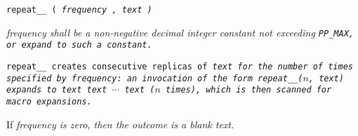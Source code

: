 
\tt{repeat__ (} \it{frequency} \tt{,} \it{text} \tt{)}


\it{frequency} shall be a non-negative decimal integer constant
not exceeding \tt{PP_MAX}, or expand to such a constant.


\tt{repeat__} creates consecutive replicas of \it{text}
for the number of times specified by \it{frequency}:
an invocation of the form \tt{repeat__(}$n$\tt{, text)} expands to \tt{text text}
$\cdots$ \tt{text} ($n$ times), which is then scanned for macro expansions.

\note If \it{frequency} is zero, then the outcome is a blank text.
